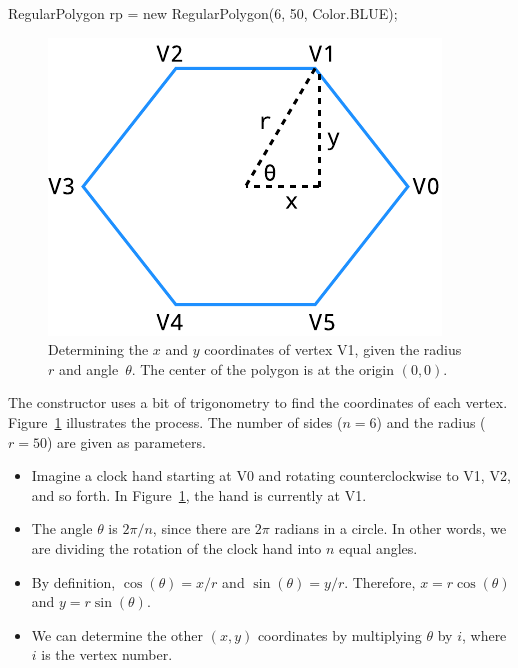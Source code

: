 \begin{code}
RegularPolygon rp = new RegularPolygon(6, 50, Color.BLUE);
\end{code}

\begin{figure}[!ht]
\begin{center}
\includegraphics{figs/hexagon.pdf}
\caption{Determining the $x$ and $y$ coordinates of vertex V1, given the radius~$r$ and angle~$\theta$. The center of the polygon is at the origin $(0, 0)$.}
\label{fig:hexagon}
\end{center}
\end{figure}

The constructor uses a bit of trigonometry to find the coordinates of each vertex.
Figure~\ref{fig:hexagon} illustrates the process.
The number of sides ($n=6$) and the radius ($r=50$) are given as parameters.

\begin{itemize}
\item Imagine a clock hand starting at V0 and rotating counterclockwise to V1, V2, and so forth.
In Figure~\ref{fig:hexagon}, the hand is currently at V1.

\item The angle $\theta$ is $2 \pi / n$, since there are $2\pi$ radians in a circle.
In other words, we are dividing the rotation of the clock hand into $n$ equal angles.

\item By definition, $\cos(\theta) = x/r$ and $\sin(\theta) = y/r$. Therefore, $x = r \cos(\theta)$ and $y = r \sin(\theta)$.

\item We can determine the other $(x, y)$ coordinates by multiplying $\theta$ by $i$, where $i$ is the vertex number.
\end{itemize}


